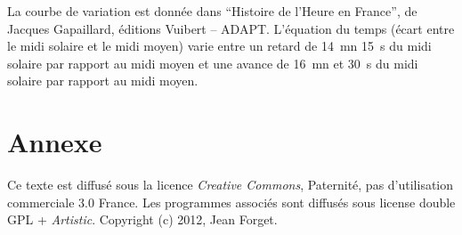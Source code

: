 \documentclass[a4paper]{article}
\newenvironment{texte}{\rmfamily}{}
\begin{document}
\begin{texte}
La courbe de variation est donnée dans ``Histoire de l'Heure en France'', 
de Jacques Gapaillard, éditions Vuibert -- ADAPT. L'équation du temps (écart
entre le midi solaire et le midi moyen) varie entre  un retard de 14~mn
15~s du midi solaire par rapport au midi moyen et une avance de 16~mn
et 30~s du midi solaire par rapport au midi moyen.

\section{Annexe}

Ce texte est diffusé sous la licence \textit{Creative Commons},
Paternité, pas d'utilisation commerciale 3.0 France.
Les programmes associés sont diffusés sous license double GPL + \textit{Artistic}.
Copyright (c) 2012, Jean Forget.

\end{texte}
\end{document}
